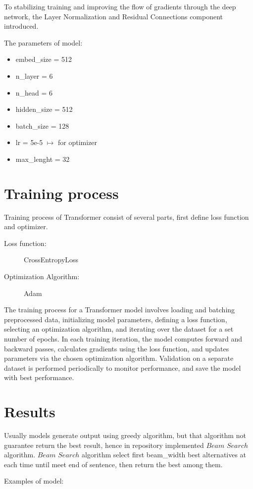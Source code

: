 \documentclass{article}
\begin{document}
To stabilizing training and improving the flow of gradients through the deep network, the Layer Normalization and Residual Connections component introduced.

The parameters of model:
\begin{itemize}
    \item embed\_size = 512
    \item n\_layer = 6
    \item n\_head = 6
    \item hidden\_size = 512
    \item batch\_size = 128
    \item lr = 5e-5 $\mapsto$ for optimizer
    \item max\_lenght = 32
\end{itemize}

\section{Training process}
Training process of Transformer consist of several parts, first define loss function and optimizer.
\begin{description}
\item[Loss function:] CrossEntropyLoss
\item[Optimization Algorithm:] Adam
\end{description}
The training process for a Transformer model involves loading and batching preprocessed data, initializing model parameters, defining a loss function, selecting an optimization algorithm, and iterating over the dataset for a set number of epochs. In each training iteration, the model computes forward and backward passes, calculates gradients using the loss function, and updates parameters via the chosen optimization algorithm. Validation on a separate dataset is performed periodically to monitor performance, and save the model with best performance.

\section{Results}
Usually models generate output using greedy algorithm, but that algorithm not guarantee return the best result, hence in repository implemented $Beam$ $Search$ algorithm. $Beam$ $Search$ algorithm select first beam\_width best alternatives at each time until meet end of sentence, then return the best among them.

Examples of model:
\end{document}
